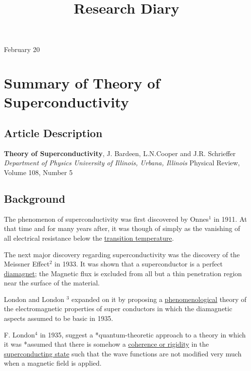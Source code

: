 \documentclass[11pt,letterpaper]{article}
\begin{document}

\title{Research Diary}

{\Huge February 20}\\[5mm]

\section*{Summary of Theory of Superconductivity}
\subsection*{Article Description}
\textbf{Theory of Superconductivity}, J. Bardeen, L.N.Cooper and J.R. Schrieffer \newline
\textit{Department of Physics University of Illinois, Urbana, Illinois} \newline
{\small Physical Review, Volume 108, Number 5}

\subsection*{Background}

The phenomenon of superconductivity was first discovered by Onnes$^1$ in 1911. At that time and for many years after, it was though of simply as the vanishing of all electrical resistance below the \underline{transition } \underline{temperature}.

The next major discovery regarding superconductivity was the discovery of the Meissner Effect$^2$ in 1933. It was shown that a superconductor is a perfect \underline{diamagnet}; the Magnetic flux is excluded from all but a thin penetration region near the surface of the material.

London and London $^3$ expanded on it by proposing a \underline{phenomenological} theory of the electromagnetic properties of super conductors in which the diamagnetic aspects assumed to be basic in 1935.

F. London$^4$ in 1935, suggest a *quantum-theoretic approach to a theory in which it was *assumed that there is somehow a \underline{coherence or rigidity} in the \underline{superconducting state} such that the wave functions are not modified very much when a magnetic field is applied.
\end{document}
